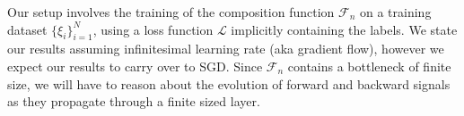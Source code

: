 \documentclass{article}
\theoremstyle{definition}
\theoremstyle{remark}
\renewcommand{\[}{\begin{eqnarray}}
\renewcommand{\]}{\end{eqnarray}}
\renewcommand{\[}{\begin{eqnarray}}
\renewcommand{\]}{\end{eqnarray}}
\newcommand{\R}{\mathbb{R}}
\newcommand{\F}{\mathcal{F}}
\begin{document}
Our setup involves the training of the composition function $\F_n$ on a training dataset $\{\xi_i\}_{i=1}^N$, using a loss function $\mathcal{L}$ implicitly containing the labels. We state our results assuming infinitesimal learning rate (aka gradient flow), however we expect our results to carry over to SGD. Since $\F_n$ contains a bottleneck of finite size, we will have to reason about the evolution of forward and backward signals as they propagate through a finite sized layer. 
\end{document}
